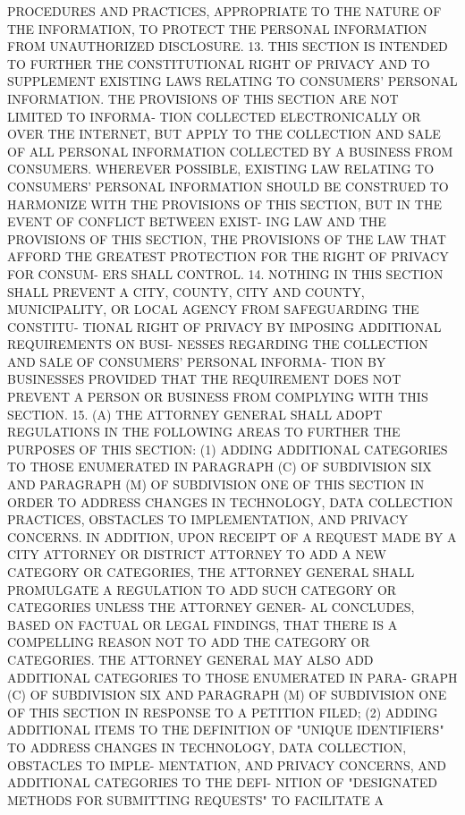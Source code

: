  PROCEDURES  AND PRACTICES, APPROPRIATE TO THE NATURE OF THE INFORMATION,
 TO PROTECT THE PERSONAL INFORMATION FROM UNAUTHORIZED DISCLOSURE.
   13.  THIS  SECTION  IS INTENDED TO FURTHER THE CONSTITUTIONAL RIGHT OF
 PRIVACY AND TO SUPPLEMENT EXISTING LAWS RELATING TO CONSUMERS'  PERSONAL
 INFORMATION.  THE PROVISIONS OF THIS SECTION ARE NOT LIMITED TO INFORMA-
 TION COLLECTED ELECTRONICALLY OR OVER THE INTERNET,  BUT  APPLY  TO  THE
 COLLECTION  AND SALE OF ALL PERSONAL INFORMATION COLLECTED BY A BUSINESS
 FROM CONSUMERS. WHEREVER POSSIBLE, EXISTING LAW RELATING  TO  CONSUMERS'
 PERSONAL   INFORMATION   SHOULD  BE  CONSTRUED  TO  HARMONIZE  WITH  THE
 PROVISIONS OF THIS SECTION, BUT IN THE EVENT OF CONFLICT BETWEEN  EXIST-
 ING  LAW  AND  THE PROVISIONS OF THIS SECTION, THE PROVISIONS OF THE LAW
 THAT AFFORD THE GREATEST PROTECTION FOR THE RIGHT OF PRIVACY FOR CONSUM-
 ERS SHALL CONTROL.
   14. NOTHING IN THIS SECTION SHALL PREVENT A  CITY,  COUNTY,  CITY  AND
 COUNTY,  MUNICIPALITY,  OR  LOCAL AGENCY FROM SAFEGUARDING THE CONSTITU-
 TIONAL RIGHT OF PRIVACY BY IMPOSING  ADDITIONAL  REQUIREMENTS  ON  BUSI-
 NESSES REGARDING THE COLLECTION AND SALE OF CONSUMERS' PERSONAL INFORMA-
 TION  BY  BUSINESSES  PROVIDED  THAT  THE REQUIREMENT DOES NOT PREVENT A
 PERSON OR BUSINESS FROM COMPLYING WITH THIS SECTION.
   15. (A) THE ATTORNEY GENERAL SHALL ADOPT REGULATIONS IN THE  FOLLOWING
 AREAS TO FURTHER THE PURPOSES OF THIS SECTION:
   (1)  ADDING ADDITIONAL CATEGORIES TO THOSE ENUMERATED IN PARAGRAPH (C)
 OF SUBDIVISION SIX AND PARAGRAPH (M) OF SUBDIVISION ONE OF THIS  SECTION
 IN  ORDER  TO  ADDRESS CHANGES IN TECHNOLOGY, DATA COLLECTION PRACTICES,
 OBSTACLES TO IMPLEMENTATION, AND PRIVACY  CONCERNS.  IN  ADDITION,  UPON
 RECEIPT OF A REQUEST MADE BY A CITY ATTORNEY OR DISTRICT ATTORNEY TO ADD
 A  NEW  CATEGORY  OR CATEGORIES, THE ATTORNEY GENERAL SHALL PROMULGATE A
 REGULATION TO ADD SUCH CATEGORY OR CATEGORIES UNLESS THE ATTORNEY GENER-
 AL CONCLUDES, BASED ON FACTUAL  OR  LEGAL  FINDINGS,  THAT  THERE  IS  A
 COMPELLING  REASON  NOT  TO ADD THE CATEGORY OR CATEGORIES. THE ATTORNEY
 GENERAL MAY ALSO ADD ADDITIONAL CATEGORIES TO THOSE ENUMERATED IN  PARA-
 GRAPH  (C)  OF  SUBDIVISION  SIX AND PARAGRAPH (M) OF SUBDIVISION ONE OF
 THIS SECTION IN RESPONSE TO A PETITION FILED;
   (2) ADDING ADDITIONAL ITEMS TO THE DEFINITION OF "UNIQUE  IDENTIFIERS"
 TO  ADDRESS  CHANGES IN TECHNOLOGY, DATA COLLECTION, OBSTACLES TO IMPLE-
 MENTATION, AND PRIVACY CONCERNS, AND ADDITIONAL CATEGORIES TO THE  DEFI-
 NITION  OF  "DESIGNATED METHODS FOR SUBMITTING REQUESTS" TO FACILITATE A
